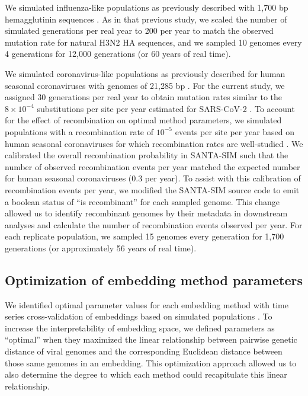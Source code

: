 \documentclass[10pt,letterpaper]{article}
\begin{document}
We simulated influenza-like populations as previously described with 1,700 bp hemagglutinin sequences \cite{Huddleston2020}.
As in that previous study, we scaled the number of simulated generations per real year to 200 per year to match the observed mutation rate for natural H3N2 HA sequences, and we sampled 10 genomes every 4 generations for 12,000 generations (or 60 years of real time).

We simulated coronavirus-like populations as previously described for human seasonal coronaviruses with genomes of 21,285 bp \cite{Muller2022}.
For the current study, we assigned 30 generations per real year to obtain mutation rates similar to the $8 \times 10^{-4}$ substitutions per site per year estimated for SARS-CoV-2 \cite{Rambaut2020}.
To account for the effect of recombination on optimal method parameters, we simulated populations with a recombination rate of $10^{-5}$ events per site per year based on human seasonal coronaviruses for which recombination rates are well-studied \cite{Muller2022,Carabelli2023}.
We calibrated the overall recombination probability in SANTA-SIM such that the number of observed recombination events per year matched the expected number for human seasonal coronaviruses (0.3 per year).
To assist with this calibration of recombination events per year, we modified the SANTA-SIM source code to emit a boolean status of ``is recombinant'' for each sampled genome.
This change allowed us to identify recombinant genomes by their metadata in downstream analyses and calculate the number of recombination events observed per year.
For each replicate population, we sampled 15 genomes every generation for 1,700 generations (or approximately 56 years of real time).

\subsection*{Optimization of embedding method parameters}

We identified optimal parameter values for each embedding method with time series cross-validation of embeddings based on simulated populations \cite{HyndmanAthanasopoulos2021}.
To increase the interpretability of embedding space, we defined parameters as ``optimal'' when they maximized the linear relationship between pairwise genetic distance of viral genomes and the corresponding Euclidean distance between those same genomes in an embedding.
This optimization approach allowed us to also determine the degree to which each method could recapitulate this linear relationship.
\end{document}
